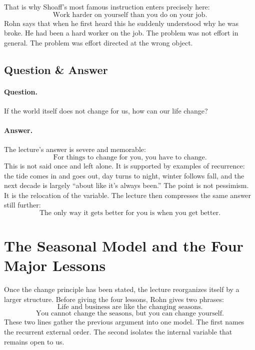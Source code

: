 That is why Shoaff's most famous instruction enters precisely here:
\begin{equation}
\text{Work harder on yourself than you do on your job.}
\end{equation}
Rohn says that when he first heard this he suddenly understood why he was broke. He had been a hard worker on the job. The problem was not effort in general. The problem was effort directed at the wrong object.

\subsection{Question \& Answer}

\paragraph{Question.} If the world itself does not change for us, how can our life change?

\paragraph{Answer.} The lecture's answer is severe and memorable:
\begin{equation}
\text{For things to change for you, you have to change.}
\end{equation}
This is not said once and left alone. It is supported by examples of recurrence: the tide comes in and goes out, day turns to night, winter follows fall, and the next decade is largely ``about like it's always been.'' The point is not pessimism. It is the relocation of the variable. The lecture then compresses the same answer still further:
\begin{equation}
\text{The only way it gets better for you is when you get better.}
\end{equation}

\section{The Seasonal Model and the Four Major Lessons}

Once the change principle has been stated, the lecture reorganizes itself by a larger structure. Before giving the four lessons, Rohn gives two phrases:
\begin{equation}
\text{Life and business are like the changing seasons.}
\end{equation}
\begin{equation}
\text{You cannot change the seasons, but you can change yourself.}
\end{equation}
These two lines gather the previous argument into one model. The first names the recurrent external order. The second isolates the internal variable that remains open to us.

